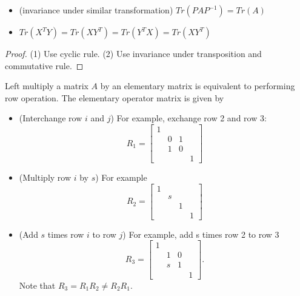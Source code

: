 \begin{refsection}
\begin{corollary}\hfill
		\begin{itemize}
			\item (invariance under similar transformation) $Tr(PAP^{-1}) = Tr(A)$
			\item $Tr(X^TY)=Tr(XY^T) = Tr(Y^TX) = Tr(XY^T)$
		\end{itemize}
\end{corollary}
\begin{proof}
(1) Use cyclic rule. (2) Use invariance under transposition and commutative rule.
\end{proof}

\begin{lemma} Left multiply a matrix $A$ by an elementary matrix is equivalent to performing row operation. The elementary operator matrix is given by	
	
\begin{itemize}
	\item (Interchange row $i$ and $j$) For example, exchange  row 2 and row 3:
	$$R_1=\begin{bmatrix}
	1 &  &  & \\ 
	& 0 & 1 & \\ 
	& 1 & 0 & \\ 
	&  &  & 1
	\end{bmatrix}$$
	\item (Multiply row $i$ by $s$) For example
		$$R_2=\begin{bmatrix}
	1 &  &  & \\ 
	& s &  & \\ 
	&  & 1 & \\ 
	&  &  & 1
	\end{bmatrix}$$
	\item (Add $s$ times row $i$ to row $j$) For example, add s times row 2 to row 3
	$$R_3=\begin{bmatrix}
	1 &  &  & \\ 
	& 1 & 0 & \\ 
	& s & 1 & \\ 
	&  &  & 1
	\end{bmatrix}.$$
	Note that $R_3 = R_1R_2 \neq R_2R_1.$
\end{itemize}	
\end{lemma}



\end{refsection}
